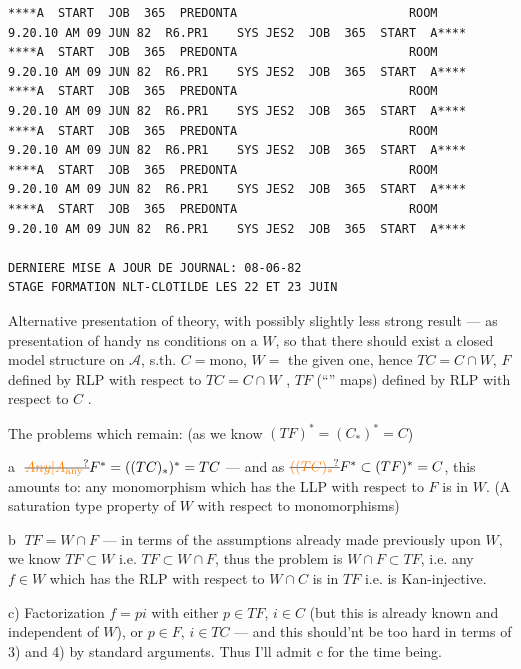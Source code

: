 {\begin{verbatim}
****A  START  JOB  365  PREDONTA                        ROOM        9.20.10 AM 09 JUN 82  R6.PR1    SYS JES2  JOB  365  START  A****
****A  START  JOB  365  PREDONTA                        ROOM        9.20.10 AM 09 JUN 82  R6.PR1    SYS JES2  JOB  365  START  A****
****A  START  JOB  365  PREDONTA                        ROOM        9.20.10 AM 09 JUN 82  R6.PR1    SYS JES2  JOB  365  START  A****
****A  START  JOB  365  PREDONTA                        ROOM        9.20.10 AM 09 JUN 82  R6.PR1    SYS JES2  JOB  365  START  A****
****A  START  JOB  365  PREDONTA                        ROOM        9.20.10 AM 09 JUN 82  R6.PR1    SYS JES2  JOB  365  START  A****
****A  START  JOB  365  PREDONTA                        ROOM        9.20.10 AM 09 JUN 82  R6.PR1    SYS JES2  JOB  365  START  A****

DERNIERE MISE A JOUR DE JOURNAL: 08-06-82
STAGE FORMATION NLT-CLOTILDE LES 22 ET 23 JUIN
\end{verbatim}
}


Alternative presentation of theory, with possibly slightly less strong result --- as presentation of handy ns conditions on a $W$, so that there should exist a closed model structure on $\mathscr A$, s.th. $C=\mathrm{mono}$, $W=$ the given one, hence $TC=C\cap W$, $F$ defined by  RLP with respect to $TC=C\cap W$ , $TF$ (``'' maps) defined by RLP with respect to $C$ .

The problems which remain: (as we know  $(TF)^*=(C_*)^*=C$)

\textcircled{a} $\deleted{\unsure{Any|A_{\text{any}}}}F^*=((TC)_*)^*=TC$ --- and as $\deleted{\unsure{((TC)_*}}F^*\subset(TF)^*=C$, this amounts to: any monomorphism which has the LLP with respect to $F$ is in $W$. (A saturation type property of $W$ with respect to monomorphisms)

\textcircled{b} $TF=W\cap F$ --- in terms of the assumptions already made previously upon $W$, we know $TF\subset W$ i.e. $TF\subset W\cap F$, thus the problem is $W\cap F\subset TF$, i.e. any $f\in W$ which has the RLP with respect to $W\cap C$ is in $TF$ i.e. is Kan-injective.

c) Factorization $f=pi$ with either $p\in TF$, $i\in C$ (but this is already known and independent of $W$), or $p\in F$, $i\in TC$  --- and this should'nt be too hard in terms of 3) and 4) by standard arguments. Thus I'll admit c for the time being.

